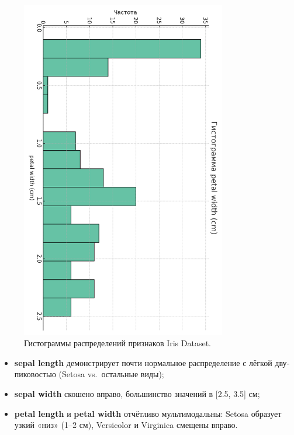 \begin{figure}[H]
  \includegraphics[width=0.8\textwidth]{images/histo_petal_width_cm_cb2.png}
  \caption{Гистограммы распределений признаков Iris Dataset.}
\end{figure}

\begin{itemize}
  \item \textbf{sepal length} демонстрирует почти нормальное распределение с лёгкой дву­пиковостью (Setosa vs.~остальные виды);
  \item \textbf{sepal width} скошено вправо, большинство значений в [2.5, 3.5] см;
  \item \textbf{petal length} и \textbf{petal width} отчётливо мультимодальны: Setosa образует узкий «низ» (1–2 см), Versicolor и Virginica смещены вправо.
\end{itemize}

